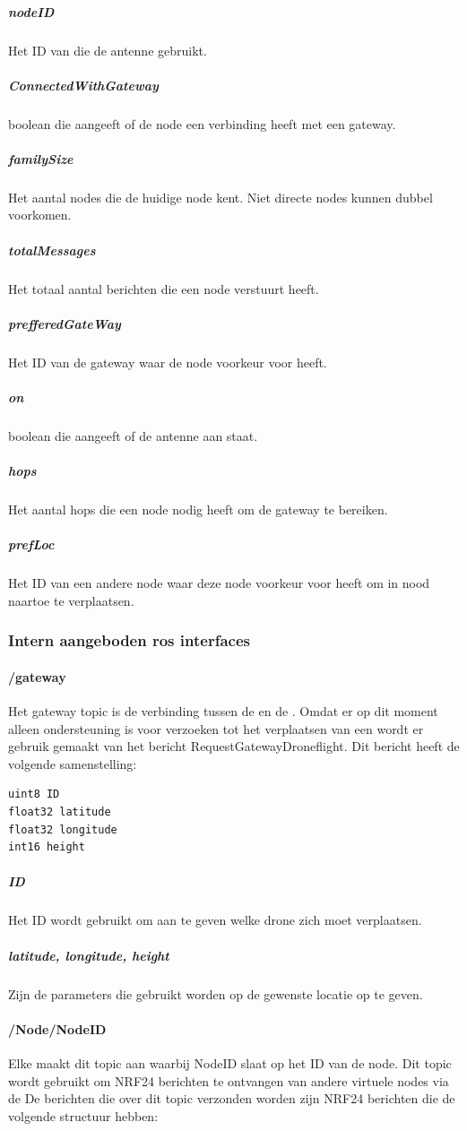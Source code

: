 \documentclass[a4paper, 11pt, oneside]{report}
\begin{document}
\subparagraph{nodeID} Het ID van die de antenne gebruikt. 
\subparagraph{ConnectedWithGateway} boolean die aangeeft of de node een verbinding heeft met een gateway.
\subparagraph{familySize} Het aantal nodes die de huidige node kent. Niet directe nodes kunnen dubbel voorkomen.
\subparagraph{totalMessages} Het totaal aantal berichten die een node verstuurt heeft.
\subparagraph{prefferedGateWay} Het ID van de gateway waar de node voorkeur voor heeft.
\subparagraph{on} boolean die aangeeft of de antenne aan staat.
\subparagraph{hops} Het aantal hops die een node nodig heeft om de gateway te bereiken.
\subparagraph{prefLoc} Het ID van een andere node waar deze node voorkeur voor heeft om in nood naartoe te verplaatsen. 

\subsubsection{Intern aangeboden ros interfaces}
\label{DetailedDesign:ros:intern:rosinterfaces}

\paragraph{/gateway}
\label{DetailedDesign:ros:intern:rosinterfaces:topic:gateway}
Het gateway topic is de verbinding tussen de  en de .
Omdat er op dit moment alleen ondersteuning is voor verzoeken tot het verplaatsen van een wordt er gebruik gemaakt van het bericht RequestGatewayDroneflight.
Dit bericht heeft de volgende samenstelling:

\begin{lstlisting}
uint8 ID
float32 latitude
float32 longitude
int16 height
\end{lstlisting}

\subparagraph{ID} Het ID wordt gebruikt om aan te geven welke drone zich moet verplaatsen.
\subparagraph{latitude, longitude, height} Zijn de parameters die gebruikt worden op de gewenste locatie op te geven.

\paragraph{/Node/NodeID}
\label{DetailedDesign:ros:intern:rosinterfaces:topic:node}
Elke  maakt dit topic aan waarbij NodeID slaat op het ID van de node. 
Dit topic wordt gebruikt om NRF24 berichten te ontvangen van andere virtuele nodes via de   
De berichten die over dit topic verzonden worden zijn NRF24 berichten die de volgende structuur hebben:
\end{document}
